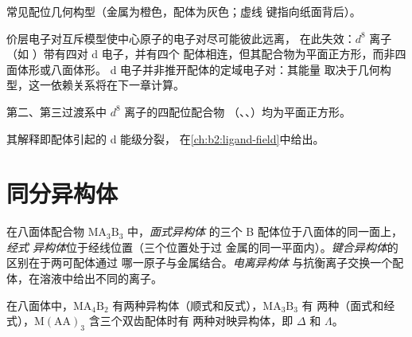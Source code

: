 \begin{omfigure}

{\small 常见配位几何构型（金属为橙色，配体为灰色；虚线
键指向纸面背后）。}
\end{omfigure}

价层电子对互斥模型使中心原子的电子对尽可能彼此远离，
在此失效：$d^8$ 离子（如 ）带有四对 d 电子，并有四个
配体相连，但其配合物为平面正方形，而非四面体形或八面体形。
d 电子并非推开配体的定域电子对：其能量
取决于几何构型，这一依赖关系将在下一章计算。

\begin{proposition}[平面正方形 $d^8$]\label{prop:b2:coordination-complexes:square-planar}
第二、第三过渡系中 $d^8$ 离子的四配位配合物
（、、）均为平面正方形。
\end{proposition}

\admitted

其解释即配体引起的 d 能级分裂，
在\cref{ch:b2:ligand-field}中给出。

\section{同分异构体}

\begin{definition}[配合物的同分异构体]\label{def:b2:coordination-complexes:isomers}
在八面体配合物 $\mathrm{MA_3B_3}$ 中，\emph{面式异构体}
的三个 B 配体位于八面体的同一面上，\emph{经式
异构体}位于经线位置（三个位置处于过
金属的同一平面内）。\emph{键合异构体}的区别在于两可配体通过
哪一原子与金属结合。\emph{电离异构体}
与抗衡离子交换一个配体，在溶液中给出不同的离子。
\end{definition}

\begin{proposition}[八面体异构体的计数]\label{prop:b2:coordination-complexes:isomer-count}
在八面体中，$\mathrm{MA_4B_2}$ 有两种异构体（顺式和反式），$\mathrm{MA_3B_3}$ 有
两种（面式和经式），$\mathrm M(\mathrm{AA})_3$ 含三个双齿配体时有
两种对映异构体，即 $\Delta$ 和 $\Lambda$。
\end{proposition}

